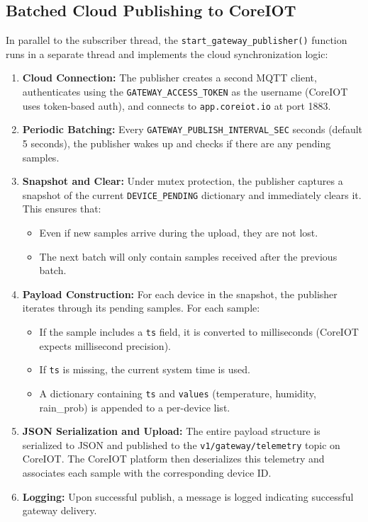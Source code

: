 \subsection*{Batched Cloud Publishing to CoreIOT}

In parallel to the subscriber thread, the \texttt{start\_gateway\_publisher()} function runs in a separate thread and implements the cloud synchronization logic:
\begin{enumerate}
  \item \textbf{Cloud Connection:} The publisher creates a second MQTT client, authenticates using the \texttt{GATEWAY\_ACCESS\_TOKEN} as the username (CoreIOT uses token-based auth), and connects to \texttt{app.coreiot.io} at port 1883.
  \item \textbf{Periodic Batching:} Every \texttt{GATEWAY\_PUBLISH\_INTERVAL\_SEC} seconds (default 5 seconds), the publisher wakes up and checks if there are any pending samples.
  \item \textbf{Snapshot and Clear:} Under mutex protection, the publisher captures a snapshot of the current \texttt{DEVICE\_PENDING} dictionary and immediately clears it. This ensures that:
    \begin{itemize}
      \item Even if new samples arrive during the upload, they are not lost.
      \item The next batch will only contain samples received after the previous batch.
    \end{itemize}
  \item \textbf{Payload Construction:} For each device in the snapshot, the publisher iterates through its pending samples. For each sample:
    \begin{itemize}
      \item If the sample includes a \texttt{ts} field, it is converted to milliseconds (CoreIOT expects millisecond precision).
      \item If \texttt{ts} is missing, the current system time is used.
      \item A dictionary containing \texttt{ts} and \texttt{values} (temperature, humidity, rain\_prob) is appended to a per-device list.
    \end{itemize}
  \item \textbf{JSON Serialization and Upload:} The entire payload structure is serialized to JSON and published to the \texttt{v1/gateway/telemetry} topic on CoreIOT. The CoreIOT platform then deserializes this telemetry and associates each sample with the corresponding device ID.
  \item \textbf{Logging:} Upon successful publish, a message is logged indicating successful gateway delivery.
\end{enumerate}

